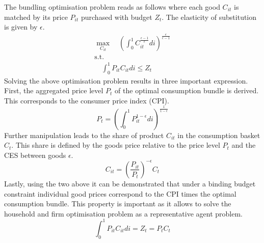 \documentclass[12pt,a4paper,english]{article} %
\begin{document}
	The bundling optimisation problem reads as follows where each good $C_{it}$ is matched by its price $P_{it}$ purchased with budget $Z_t$. The elasticity of substitution is given by $\epsilon$.
	\begin{equation}
		\begin{split}
			\max_{C_{it}}
			\quad \left(\int_{0}^{1} C_{it}^{ \frac{\epsilon - 1}{\epsilon} } di 
			\right)^{ \frac{\epsilon}{\epsilon - 1} }\\
			\textrm{s.t.}\\
			\quad \int_{0}^{1} P_{it} C_{it} di \leq Z_t
		\end{split}
	\end{equation}
	Solving the above optimisation problem results in three important expression. First, the aggregated price level $P_t$ of the optimal consumption bundle is derived. This corresponds to the consumer price index (CPI).
	\begin{equation} \label{eq:1}
			P_t = \left(
						\int_{0}^{1} P_{it}^{ 1 - \epsilon } di 
					\right)^{ \frac{1}{1 - \epsilon} }
	\end{equation}
	Further manipulation leads to the share of product $C_{it}$ in the consumption basket $C_t$. This share is defined by the goods price relative to the price level $P_t$ and the CES between goods $\epsilon$.
	\begin{equation} \label{eq:cshare}
		C_{it} = \left( \frac{P_{it}}{P_t} \right)^{- \epsilon} C_t
	\end{equation}
	Lastly, using the two above it can be demonstrated that under a binding budget constraint individual good prices correspond to the CPI times the optimal consumption bundle.
	This property is important as it allows to solve the household and firm optimisation problem as a representative agent problem.
	\begin{equation}
		\int_{0}^{1} P_{it} C_{it} di = Z_t = P_t C_t
	\end{equation}
\end{document}
